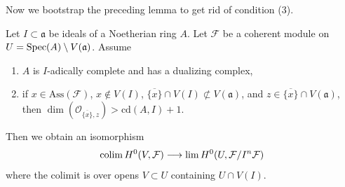 \noindent
Now we bootstrap the preceding lemma to get rid of condition (3).

\begin{proposition}
\label{proposition-application-H0}
Let $I \subset \mathfrak a$ be ideals of a Noetherian ring $A$.
Let $\mathcal{F}$ be a coherent module on
$U = \mathop{\mathrm{Spec}}(A) \setminus V(\mathfrak a)$.
Assume
\begin{enumerate}
\item $A$ is $I$-adically complete and has a dualizing complex,
\item if $x \in \text{Ass}(\mathcal{F})$, $x \not \in V(I)$,
$\overline{\{x\}} \cap V(I) \not \subset V(\mathfrak a)$,
and $z \in \overline{\{x\}} \cap V(\mathfrak a)$, then
$\dim(\mathcal{O}_{\overline{\{x\}}, z}) > \text{cd}(A, I) + 1$.
\end{enumerate}
Then we obtain an isomorphism
$$
\mathop{\mathrm{colim}}\nolimits H^0(V, \mathcal{F})
\longrightarrow
\mathop{\mathrm{lim}}\nolimits H^0(U, \mathcal{F}/I^n\mathcal{F})
$$
where the colimit is over opens $V \subset U$ containing $U \cap V(I)$.
\end{proposition}

